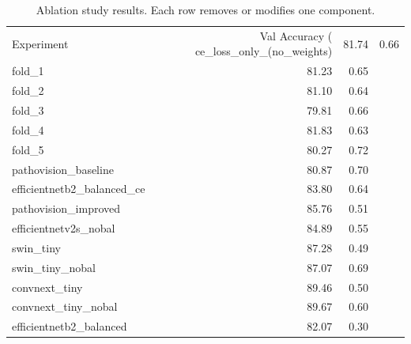 \begin{table}
\caption{Ablation study results. Each row removes or modifies one component.}
\label{tab:ablation}
\begin{tabular}{lrr}
\toprule
Experiment & Val Accuracy (%
\midrule
ce_loss_only_(no_weights) & 81.74 & 0.66 \\
fold_1 & 81.23 & 0.65 \\
fold_2 & 81.10 & 0.64 \\
fold_3 & 79.81 & 0.66 \\
fold_4 & 81.83 & 0.63 \\
fold_5 & 80.27 & 0.72 \\
pathovision_baseline & 80.87 & 0.70 \\
efficientnetb2_balanced_ce & 83.80 & 0.64 \\
pathovision_improved & 85.76 & 0.51 \\
efficientnetv2s_nobal & 84.89 & 0.55 \\
swin_tiny & 87.28 & 0.49 \\
swin_tiny_nobal & 87.07 & 0.69 \\
convnext_tiny & 89.46 & 0.50 \\
convnext_tiny_nobal & 89.67 & 0.60 \\
efficientnetb2_balanced & 82.07 & 0.30 \\
\bottomrule
\end{tabular}
\end{table}
